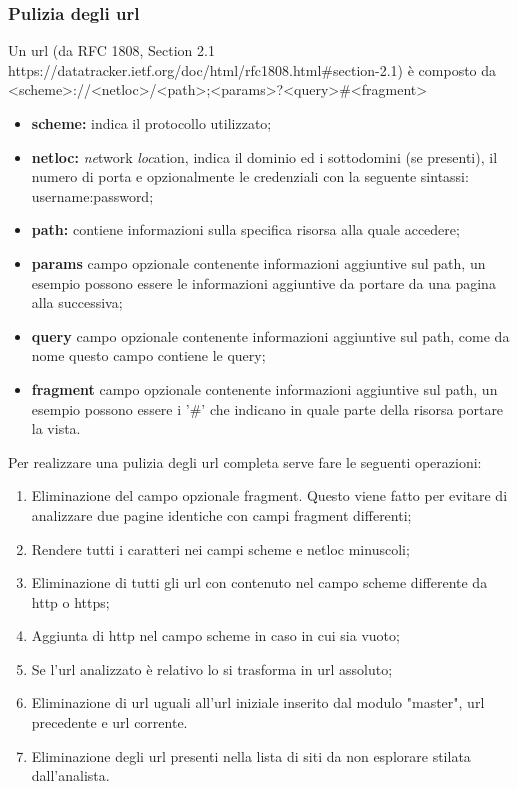 \subsubsection{Pulizia degli url}
Un url (da RFC 1808, Section 2.1 https://datatracker.ietf.org/doc/html/rfc1808.html\#section-2.1) è composto da \newline
<scheme>://<netloc>/<path>;<params>?<query>\#<fragment>
\newline
\begin{itemize}
	\item \textbf{scheme:} indica il protocollo utilizzato;
	\item \textbf{netloc:} \textit{ne}twork \textit{loc}ation, indica il dominio ed i sottodomini (se presenti), il numero di porta e opzionalmente le credenziali con la seguente sintassi: username:password;
	\item \textbf{path:} contiene informazioni sulla specifica risorsa alla quale accedere;
	\item \textbf{params} campo opzionale contenente informazioni aggiuntive sul path, un esempio possono essere le informazioni aggiuntive da portare da una pagina alla successiva;
	\item \textbf{query} campo opzionale contenente informazioni aggiuntive sul path, come da nome questo campo contiene le query;
	\item \textbf{fragment} campo opzionale contenente informazioni aggiuntive sul path, un esempio possono essere i '\#' che indicano in quale parte della risorsa portare la vista.
\end{itemize}

Per realizzare una pulizia degli url completa serve fare le seguenti operazioni:
\begin{enumerate}
	\item Eliminazione del campo opzionale fragment. Questo viene fatto per evitare di analizzare due pagine identiche con campi fragment differenti;
	\item Rendere tutti i caratteri nei campi scheme e netloc minuscoli;
	\item Eliminazione di tutti gli url con contenuto nel campo scheme differente da http o https;
	\item Aggiunta di http nel campo scheme in caso in cui sia vuoto;
	\item Se l'url analizzato è relativo lo si trasforma in url assoluto;
	\item Eliminazione di url uguali all'url iniziale inserito dal modulo "master", url precedente e url corrente.
	\item Eliminazione degli url presenti nella lista di siti da non esplorare stilata dall'analista.
\end{enumerate}

